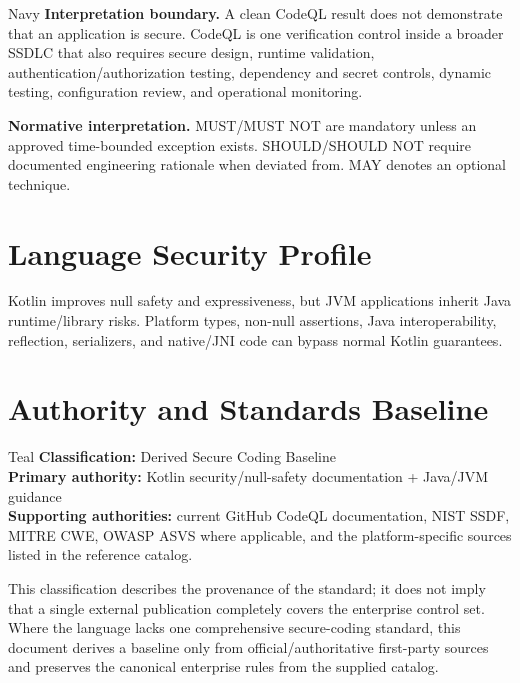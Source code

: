 \documentclass[10pt,letterpaper]{article}
\begin{document}
\begin{callout}{Navy}
\textbf{Interpretation boundary.} A clean CodeQL result does not demonstrate that an application is secure. CodeQL is one verification control inside a broader SSDLC that also requires secure design, runtime validation, authentication/authorization testing, dependency and secret controls, dynamic testing, configuration review, and operational monitoring.
\end{callout}

\textbf{Normative interpretation.} MUST/MUST NOT are mandatory unless an approved time-bounded exception exists. SHOULD/SHOULD NOT require documented engineering rationale when deviated from. MAY denotes an optional technique.

\section{Language Security Profile}
Kotlin improves null safety and expressiveness, but JVM applications inherit Java runtime/library risks. Platform types, non-null assertions, Java interoperability, reflection, serializers, and native/JNI code can bypass normal Kotlin guarantees.
\section{Authority and Standards Baseline}
\begin{callout}{Teal}
\textbf{Classification:} Derived Secure Coding Baseline\\
\textbf{Primary authority:} Kotlin security/null-safety documentation + Java/JVM guidance\\
\textbf{Supporting authorities:} current GitHub CodeQL documentation, NIST SSDF, MITRE CWE, OWASP ASVS where applicable, and the platform-specific sources listed in the reference catalog.
\end{callout}
This classification describes the provenance of the standard; it does not imply that a single external publication completely covers the enterprise control set. Where the language lacks one comprehensive secure-coding standard, this document derives a baseline only from official/authoritative first-party sources and preserves the canonical enterprise rules from the supplied catalog.
\end{document}
